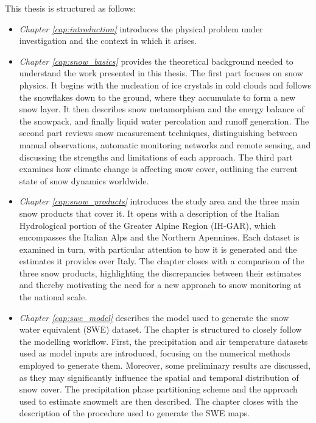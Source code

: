 This thesis is structured as follows:
\begin{itemize}[label=$\blacktriangleright$]
    \item \textit{Chapter \ref{cap:introduction}} introduces the physical problem under investigation and the context in which it arises.
    \item \textit{Chapter \ref{cap:snow_basics}} provides the theoretical background needed to understand the work presented in this thesis. The 
    first part focuses on snow physics. It begins with the nucleation of ice crystals in cold clouds and follows the snowflakes down to the 
    ground, where they accumulate to form a new snow layer. It then describes snow metamorphism and the energy balance of the snowpack, and finally 
    liquid water percolation and runoff generation. The second part reviews snow measurement techniques, distinguishing between manual observations, 
    automatic monitoring networks and remote sensing, and discussing the strengths and limitations of each approach. The third part examines how 
    climate change is affecting snow cover, outlining the current state of snow dynamics worldwide.
    \item \textit{Chapter \ref{cap:snow_products}} introduces the study area and the three main snow products that cover it. It opens with a 
    description of the Italian Hydrological portion of the Greater Alpine Region (IH-GAR), which encompasses the Italian Alps and the Northern Apennines. 
    Each dataset is examined in turn, with particular attention to how it is generated and the estimates it provides over Italy. The chapter closes 
    with a comparison of the three snow products, highlighting the discrepancies between their estimates and thereby motivating the need for a new 
    approach to snow monitoring at the national scale.
    \item \textit{Chapter \ref{cap:swe_model}} describes the model used to generate the snow water equivalent (SWE) dataset. The chapter is 
    structured to closely follow the modelling workflow. First, the precipitation and air temperature datasets used as model inputs are introduced, 
    focusing on the numerical methods employed to generate them. Moreover, some preliminary results are discussed, as they may significantly influence 
    the spatial and temporal distribution of snow cover. The precipitation phase partitioning scheme and the approach used to estimate snowmelt are then 
    described. The chapter closes with the description of the procedure used to generate the SWE maps.

\end{itemize}
